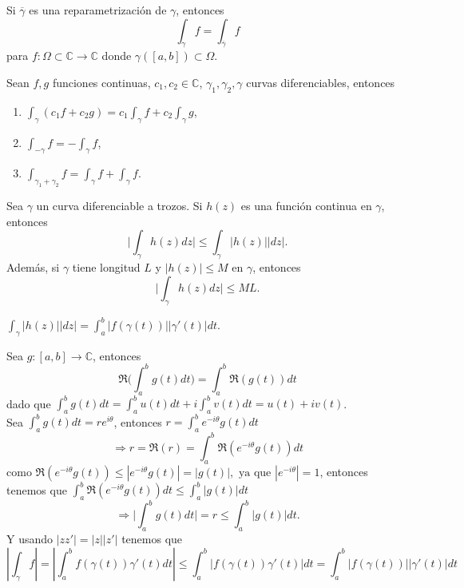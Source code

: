 \begin{prop}
  Si $\overline{\gamma}$ es una reparametrización de $\gamma$, entonces
  \[ 
    \int_{\gamma}^{} f = \int_{\overline{\gamma}}^{} f 
  \] 
  para $f: \Omega \subset \mathbb{C} \to \mathbb{C}$ donde $ \gamma([a, b]) \subset \Omega$.
\end{prop}

\begin{prop}
  Sean $f,g$ funciones continuas, $c_{1}, c_{2} \in \mathbb{C}$, $\gamma_{1}, \gamma_{2}, \gamma$ curvas diferenciables, entonces
  \begin{enumerate}[label=(\roman*)]
    \item $\int_{\gamma}^{} (c_{1} f + c_{2} g) = c_{1} \int_{\gamma}^{} f + c_{2} \int_{\gamma}^{}  g$,
    \item $\int_{-\gamma}^{} f = - \int_{\gamma}^{} f$,
    \item $\int_{\gamma_{1} + \gamma_{2}}^{} f = \int_{\gamma}^{} f + \int_{\gamma}^{} f$.
  \end{enumerate}
\end{prop}

\begin{theo}
  Sea $\gamma$ un curva diferenciable a trozos. Si $h(z)$ es una función continua en $\gamma$, entonces
  \[ 
    \Big | \int_{\gamma}^{} h(z) dz \Big | \leq \int_{\gamma}^{} | h(z) | | dz | .
  \] 
  Además, si $\gamma$ tiene longitud $L$ y $| h(z) | \leq M$ en $\gamma$, entonces
  \[ 
    \Big | \int_{\gamma}^{} h(z) dz \Big | \leq ML .
  \] 
\end{theo}

\begin{obs}
  $\int_{\gamma}^{} | h(z) | | dz | = \int_{a}^{b} | f(\gamma(t)) || \gamma'(t) | dt.$ 
\end{obs}

\begin{dem}
  Sea $g: [a, b] \to \mathbb{C}$, entonces
  \[ 
    \Re \Bigg ( \int_{a}^{b} g(t) dt \Bigg ) = \int_{a}^{b} \Re (g(t)) dt 
  \] 
  dado que $ \int_{a}^{b} g(t) dt = \int_{a}^{b} u(t) dt + i \int_{a}^{b} v(t) dt = u(t) + i v(t)$. \\

  Sea $\int_{a}^{b} g(t) dt = r e^{i \theta}$, entonces $r = \int_{a}^{b} e^{-i \theta} g(t) dt$
  \[ 
    \Rightarrow r = \Re (r) = \int_{a}^{b} \Re (e^{-i \theta} g(t)) dt 
  \] 
  como $\Re (e^{-i \theta} g(t) ) \leq | e^{-i \theta} g(t) | = | g(t) |, \text{ ya que } | e^{-i \theta} | = 1$, entonces tenemos que $\int_{a}^{b} \Re (e^{-i \theta} g(t)) dt \leq \int_{a}^{b} | g(t) | dt$
  \[ 
    \Rightarrow \Bigg | \int_{a}^{b} g(t) dt \Bigg | = r \leq \int_{a}^{b} | g(t) | dt. 
  \] 
  Y usando $| z z' | = | z || z' |$ tenemos que
  \[ 
    | \int_{\gamma}^{} f | = |  \int_{a}^{b} f(\gamma(t))\gamma'(t) dt | \leq \int_{a}^{b} | f(\gamma(t))\gamma'(t) | dt = \int_{a}^{b} | f(\gamma(t)) || \gamma'(t) | dt
  \] 
\end{dem}

